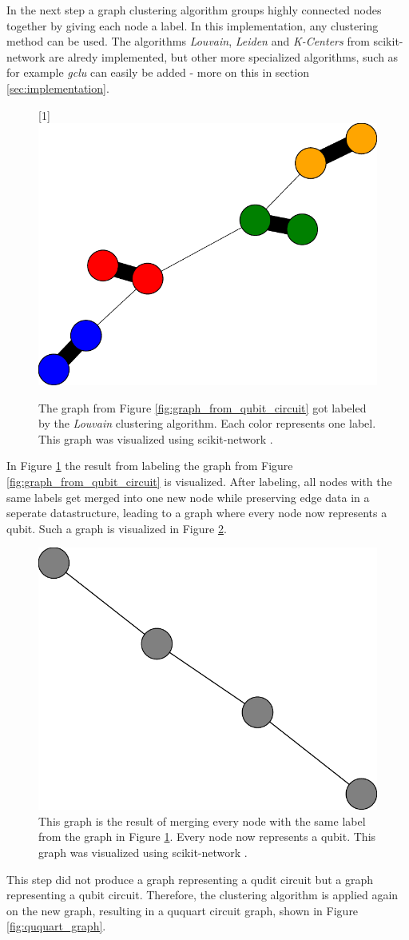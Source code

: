   In the next step a graph clustering algorithm groups highly connected nodes together by giving each node a label. In this implementation, any clustering method can be used. The algorithms \textit{Louvain}, \textit{Leiden} and \textit{K-Centers} from scikit-network \cite{JMLR:v21:20-412} are alredy implemented, but other more specialized algorithms, such as for example \textit{gclu} \cite{Sieranoja2021-ik} can easily be added - more on this in section \ref{sec:implementation}.
  \begin{figure}[H]
    \centering
    \scalebox{-1}[1]{\includegraphics*[width=.25\textwidth]{figures/graphs/evolution-0/graph_wl.pdf}}
    \caption{The graph from Figure \ref{fig:graph_from_qubit_circuit} got labeled by the \textit{Louvain} clustering algorithm. Each color represents one label. This graph was visualized using scikit-network \cite{JMLR:v21:20-412}.}
    \label{fig:graph_from_qubit_circuit_labeled}
  \end{figure}
  In Figure \ref{fig:graph_from_qubit_circuit_labeled} the result from labeling the graph from Figure \ref{fig:graph_from_qubit_circuit} is visualized. After labeling, all nodes with the same labels get merged into one new node while preserving edge data in a seperate datastructure, leading to a graph where every node now represents a qubit. Such a graph is visualized in Figure \ref{fig:merged_graph}.
  \begin{figure}[H]
    \centering
    \includegraphics*[width=.25\textwidth]{figures/graphs/evolution-1/graph_w.pdf}
    \caption{This graph is the result of merging every node with the same label from the graph in Figure \ref{fig:graph_from_qubit_circuit_labeled}. Every node now represents a qubit. This graph was visualized using scikit-network \cite{JMLR:v21:20-412}.}
    \label{fig:merged_graph}
  \end{figure}
  This step did not produce a graph representing a qudit circuit but a graph representing a qubit circuit. Therefore, the clustering algorithm is applied again on the new graph, resulting in a ququart circuit graph, shown in Figure \ref{fig:ququart_graph}.
